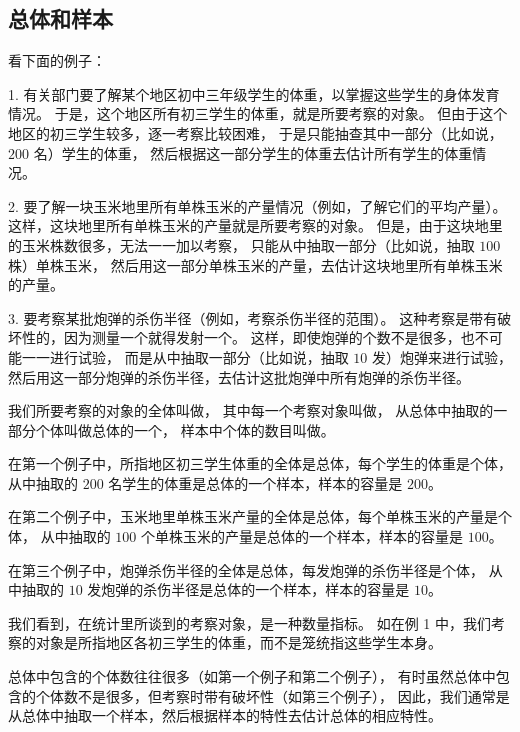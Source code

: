 \subsection{总体和样本}\label{subsec:16-1}

看下面的例子：

1. 有关部门要了解某个地区初中三年级学生的体重，以掌握这些学生的身体发育情况。
于是，这个地区所有初三学生的体重，就是所要考察的对象。
但由于这个地区的初三学生较多，逐一考察比较困难，
于是只能抽查其中一部分（比如说，$200$ 名）学生的体重，
然后根据这一部分学生的体重去估计所有学生的体重情况。

2. 要了解一块玉米地里所有单株玉米的产量情况（例如，了解它们的平均产量）。
这样，这块地里所有单株玉米的产量就是所要考察的对象。
但是，由于这块地里的玉米株数很多，无法一一加以考察，
只能从中抽取一部分（比如说，抽取 $100$ 株）单株玉米，
然后用这一部分单株玉米的产量，去估计这块地里所有单株玉米的产量。

3. 要考察某批炮弹的杀伤半径（例如，考察杀伤半径的范围）。
这种考察是带有破坏性的，因为测量一个就得发射一个。
这样，即使炮弹的个数不是很多，也不可能一一进行试验，
而是从中抽取一部分（比如说，抽取 $10$ 发）炮弹来进行试验，
然后用这一部分炮弹的杀伤半径，去估计这批炮弹中所有炮弹的杀伤半径。

我们所要考察的对象的全体叫做，
其中每一个考察对象叫做，
从总体中抽取的一部分个体叫做总体的一个，
样本中个体的数目叫做。

在第一个例子中，所指地区初三学生体重的全体是总体，每个学生的体重是个体，
从中抽取的 $200$ 名学生的体重是总体的一个样本，样本的容量是 $200$。

在第二个例子中，玉米地里单株玉米产量的全体是总体，每个单株玉米的产量是个体，
从中抽取的 $100$ 个单株玉米的产量是总体的一个样本，样本的容量是 $100$。

在第三个例子中，炮弹杀伤半径的全体是总体，每发炮弹的杀伤半径是个体，
从中抽取的 $10$ 发炮弹的杀伤半径是总体的一个样本，样本的容量是 $10$。

我们看到，在统计里所谈到的考察对象，是一种数量指标。
如在例 1 中，我们考察的对象是所指地区各初三学生的体重，而不是笼统指这些学生本身。

总体中包含的个体数往往很多（如第一个例子和第二个例子），
有时虽然总体中包含的个体数不是很多，但考察时带有破坏性（如第三个例子），
因此，我们通常是从总体中抽取一个样本，然后根据样本的特性去估计总体的相应特性。


